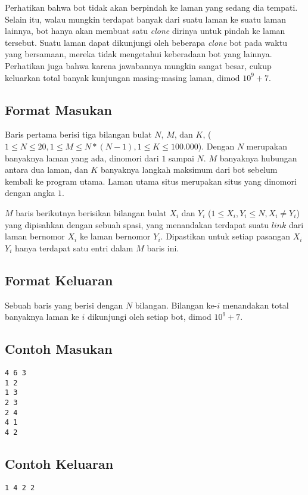 \documentclass{article}
\begin{document}
Perhatikan bahwa bot tidak akan berpindah ke laman yang sedang dia tempati. Selain itu, walau mungkin terdapat banyak  dari suatu laman ke suatu laman lainnya, bot hanya akan membuat satu \textit{clone} dirinya untuk pindah ke laman tersebut. Suatu laman dapat dikunjungi oleh beberapa \textit{clone} bot pada waktu yang bersamaan, mereka tidak mengetahui keberadaan bot yang lainnya. Perhatikan juga bahwa karena jawabannya mungkin sangat besar, cukup keluarkan total banyak kunjungan masing-masing laman, dimod $10^9+7$.

\subsection*{Format Masukan}

Baris pertama berisi tiga bilangan bulat $N$, $M$, dan $K$, ($1 \leq N \leq 20, 1 \leq M \leq N*(N-1), 1 \leq K \leq 100.000$). Dengan $N$ merupakan banyaknya laman yang ada, dinomori dari $1$ sampai $N$. $M$ banyaknya hubungan  antara dua laman, dan $K$ banyaknya langkah maksimum dari bot sebelum kembali ke program utama. Laman utama situs merupakan situs yang dinomori dengan angka $1$.

$M$ baris berikutnya berisikan bilangan bulat $X_i$ dan $Y_i$ ($1 \leq X_i, Y_i \leq N, X_i \ne Y_i$) yang dipisahkan dengan sebuah spasi, yang menandakan terdapat suatu $\textit{link}$ dari laman bernomor $X_i$ ke laman bernomor $Y_i$. Dipastikan untuk setiap pasangan $X_i$ $Y_i$ hanya terdapat satu entri dalam $M$ baris ini.

\subsection*{Format Keluaran}

Sebuah baris yang berisi dengan $N$ bilangan. Bilangan ke-$i$ menandakan total banyaknya laman ke $i$ dikunjungi oleh setiap bot, dimod $10^9+7$.
\\

\begin{multicols}{2}
\subsection*{Contoh Masukan}
\begin{lstlisting}
4 6 3
1 2
1 3
2 3
2 4
4 1
4 2
\end{lstlisting}
\columnbreak
\subsection*{Contoh Keluaran}
\begin{lstlisting}
1 4 2 2
\end{lstlisting}
\vfill
\null
\end{multicols}
\end{document}
